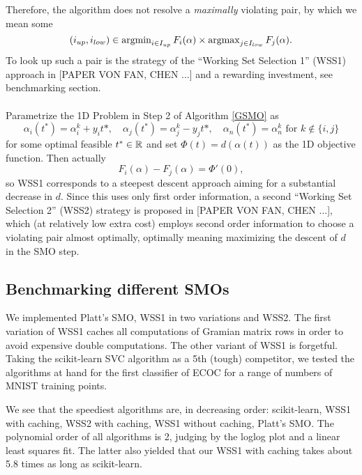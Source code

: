 Therefore, the algorithm does not resolve a \textit{maximally} violating pair, by which we mean some 
\[
(i_{up},i_{low}) \in \operatorname{argmin}_{i \in I_{up}}F_i(\alpha) \times \operatorname{argmax}_{j \in I_{low}}F_j(\alpha).
\] To look up such a pair is the strategy of the ``Working Set Selection 1'' (WSS1) approach in [PAPER VON FAN, CHEN ...] and a rewarding investment, see benchmarking section. \\\\
Parametrize the 1D Problem in Step 2 of Algorithm \ref{GSMO} as
\[
\alpha_i(t^*) = \alpha^k_i + y_i t*, \quad \alpha_j(t^*) = \alpha^k_j - y_j t*, \quad \alpha_n(t^*) = \alpha^k_n \text{ for } k \notin \{i,j\}
\]
for some optimal feasible $t^* \in \mathbb{R}$ and set $\Phi(t) = d(\alpha(t))$ as the 1D objective function. Then actually
\begin{equation}
F_i(\alpha) - F_j(\alpha) = \Phi'(0),
\end{equation}
so WSS1 corresponds to a steepest descent approach aiming for a substantial decrease in $d$. Since this uses only first order information, a second ``Working Set Selection 2'' (WSS2) strategy is proposed in [PAPER VON FAN, CHEN ...], which (at relatively low extra cost) employs second order information to choose a violating pair almost optimally, optimally meaning maximizing the descent of $d$ in the SMO step.

\subsection{Benchmarking different SMOs}

We implemented Platt's SMO, WSS1 in two variations and WSS2. The first variation of WSS1 caches all computations of Gramian matrix rows in order to avoid expensive double computations. The other variant of WSS1 is forgetful. Taking the scikit-learn SVC algorithm as a 5th (tough) competitor, we tested the algorithms at hand for the first classifier of ECOC for a range of numbers of MNIST training points.


We see that the speediest algorithms are, in decreasing order: scikit-learn, WSS1 with caching, WSS2 with caching, WSS1 without caching, Platt's SMO. The polynomial order of all algorithms is 2, judging by the loglog plot and a linear least squares fit. The latter also yielded that our WSS1 with caching takes about 5.8 times as long as scikit-learn.